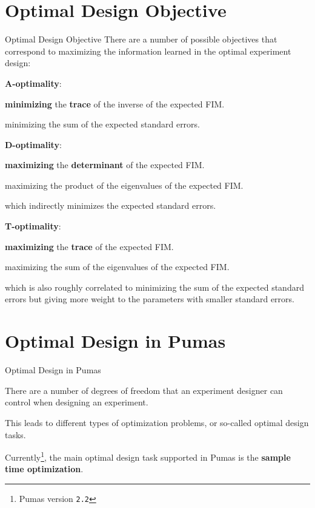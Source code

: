 \documentclass[aspectratio=169]{beamer}                    %
\begin{document}
\section{Optimal Design Objective}
\begin{frame}{Optimal Design Objective}
	\footnotesize
	There are a number of possible objectives that correspond to maximizing the
	information learned in the optimal experiment design:
	\begin{vfilleditems}
		\footnotesize
		\item \textbf{A-optimality}:
		\begin{vfilleditems}
			\footnotesize
			\item \textbf{minimizing} the \textbf{trace} of the inverse of the expected FIM.
			\item minimizing the sum of the expected standard errors.
		\end{vfilleditems}
		\item \textbf{D-optimality}:
		\begin{vfilleditems}
			\footnotesize
			\item \textbf{maximizing} the \textbf{determinant} of the expected FIM.
			\item maximizing the product of the eigenvalues of the expected FIM.
			\item which indirectly minimizes the expected standard errors.
		\end{vfilleditems}
		\item \textbf{T-optimality}:
		\begin{vfilleditems}
			\footnotesize
			\item \textbf{maximizing} the \textbf{trace} of the expected FIM.
			\item maximizing the sum of the eigenvalues of the expected FIM.
			\item which is also roughly correlated to minimizing the
			sum of the expected standard errors but giving more weight
			to the parameters with smaller standard errors.
		\end{vfilleditems}
	\end{vfilleditems}
\end{frame}

\section{Optimal Design in Pumas}
\begin{frame}{Optimal Design in Pumas}
	\begin{vfilleditems}
		\item There are a number of degrees of freedom that an experiment designer can
		control when designing an experiment.
		\item This leads to different types of optimization problems,
		or so-called optimal design tasks.
		\item Currently\footnote{Pumas version \texttt{2.2}},
		the main optimal design task supported in Pumas is the
		\textbf{sample time optimization}.
	\end{vfilleditems}
\end{frame}
\end{document}
